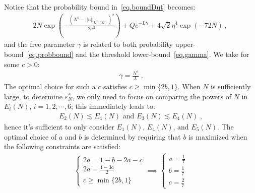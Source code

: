 \documentclass[a4paper,11pt]{article}
\newcommand{\x}{\mathbf{x}}
\theoremstyle{definition}
\begin{document}


Notice that the probability bound in~\eqref{eq.boundDut} becomes:
\begin{align}
2N \exp(-\frac{(N^b-||u||_{L^\infty(\Omega)})^2}{2\sigma^2})+Qe^{-L\gamma}+4\sqrt{2}\eta^4\exp(-72N)\,,~\label{eq.probbound}
\end{align}
and the free parameter $\gamma$ is related to both probability upper-bound~\eqref{eq.probbound} and the threshold lower-bound~\eqref{eq.gamma}. We take for some $c>0$:
\begin{align*}
\gamma = \frac{N^c}{L}\;.
\end{align*}
The optimal choice for such a $c$ satisfies $c\geq \min\{2b,1\}$. When $N$ is sufficiently large, to determine $\varepsilon_N^*$, we only need to focus on comparing the powers of $N$ in $E_i(N)$, $i=1,2,\cdots,6$; this immediately leads to:
\begin{align}
E_2(N)\lesssim E_4(N) \text{~and~} E_3(N)\lesssim E_4(N)	\;,
\end{align}
hence it's sufficient to only consider $E_1(N)$, $E_4(N)$, and $E_5(N)$. The optimal choice of $a$ and $b$ is determined by requiring that $b$ is maximized when the following constraints are satisfied:
\begin{align}
\begin{cases}
	2a = 1-b-2a-c\\
	2a = \frac{1-3a}{2}\\
	c\geq \min\{2b,1\}
\end{cases}	\implies\begin{cases}
a= \frac{1}{7}\\
b = \frac{1}{7}\\
c = \frac{2}{7}	
\end{cases}\label{eq.parchoice}
\end{align}
\end{document}
